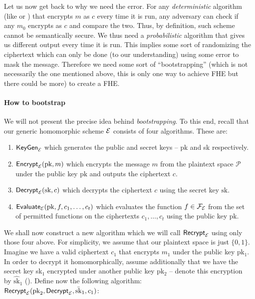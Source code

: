 Let us now get back to why we need the error. For any \textit{deterministic} algorithm (like  or ) that encrypts $m$ as $c$ every time it is run, any adversary can check if any $m_0$ encrypts as $c$ and compare the two. Thus, by definition, such scheme cannot be semantically secure. We thus need a \textit{probabilistic} algorithm that gives us different output every time it is run. This implies some sort of randomizing the ciphertext which can only be done (to our understanding) using some error to mask the message. Therefore we need some sort of ``bootstrapping'' (which is not necessarily the one mentioned above, this is only one way to achieve FHE but there could be more) to create a FHE.

\paragraph{How to bootstrap}
We will not present the precise idea behind \textit{bootstrapping}. To this end, recall that our generic homomorphic scheme $\mathcal{E}$ consists of four algorithms. These are:
\begin{enumerate}
	\item $\textsf{KeyGen}_{\mathcal{E}}$ which generates the public and secret keys -- pk and sk respectively.
	\item $\textsf{Encrypt}_{\mathcal{E}}(\text{pk}, m)$ which encrypts the message $m$ from the plaintext space $\mathcal{P}$ under the public key $\text{pk}$ and outputs the ciphertext $c$.
	\item $\textsf{Decrypt}_{\mathcal{E}}(\text{sk}, c)$ which decrypts the ciphertext $c$ using the secret key $\text{sk}$.
	\item $\textsf{Evaluate}_{\mathcal{E}}(\text{pk}, f, c_1, \ldots, c_t)$ which evaluates the function $f \in \mathcal{F}_{\mathcal{E}}$ from the set of permitted functions on the ciphertexts $c_1, \ldots, c_t$ using the public key pk.
\end{enumerate}
We shall now construct a new algorithm which we will call $\textsf{Recrypt}_{\mathcal{E}}$ using only those four above. For simplicity, we assume that our plaintext space is just $\{0,1\}$. Imagine we have a valid ciphertext $c_1$ that encrypts $m_1$ under the public key pk$_1$. In order to decrypt it homomorphically, assume additionally that we have the secret key sk$_1$ encrypted under another public key pk$_2$ -- denote this encryption by $\hat{\text{sk}}_1$ (). Define now the following algorithm:\\
$\textsf{Recrypt}_{\mathcal{E}}(\text{pk}_2, \textsf{Decrypt}_{\mathcal{E}}, \bar{\text{sk}}_1, c_1)$:


